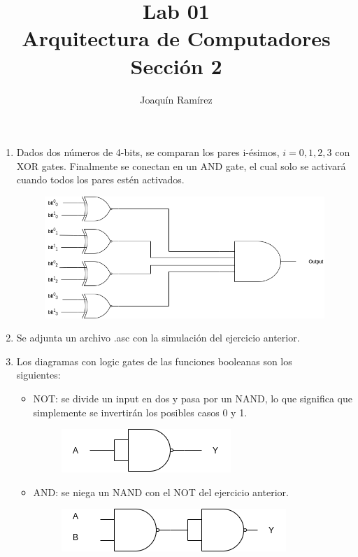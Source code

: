 \documentclass[11pt,a4paper]{article}
\title{Lab 01\\Arquitectura de Computadores \\ Sección 2}
\author{Joaquín Ramírez}
\begin{document}
\maketitle
\begin{enumerate}
\item Dados dos números de 4-bits, se comparan los pares i-ésimos, $i = 0, 1, 2, 3$ con XOR gates. Finalmente se conectan en un AND gate, el cual solo se activará cuando todos los pares estén activados.
\begin{figure}[h!]
\centering
\includegraphics[scale=0.4]{1.png} 
\end{figure}
\item Se adjunta un archivo .asc con la simulación del ejercicio anterior.
\item Los diagramas con logic gates de las funciones booleanas son los \\siguientes:
\begin{itemize}
\item NOT: se divide un input en dos y pasa por un NAND, lo que significa que simplemente se invertirán los posibles casos 0 y 1.
\begin{figure}[h!]
\centering
\includegraphics[scale=0.5]{2.png} 
\end{figure}
\item AND: se niega un NAND con el NOT del ejercicio anterior.
\begin{figure}[h!]
\centering
\includegraphics[scale=0.5]{3.png} 
\end{figure}
\\

\end{itemize}
\end{enumerate}
\end{document}
